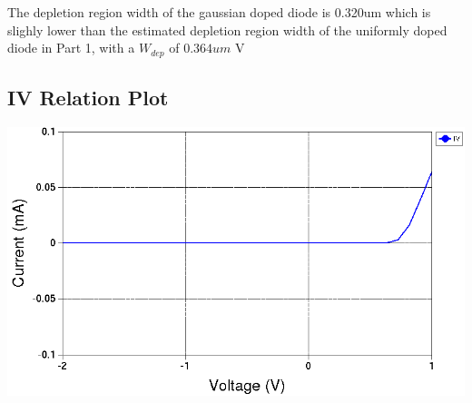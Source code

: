 \documentclass[12pt]{article}
\begin{document}
The depletion region width of the gaussian doped diode is 0.320um which is slighly lower than the estimated depletion region width of the uniformly doped diode in Part 1, with a $W_{dep}$ of $0.364um$ V\\

\subsection{IV Relation Plot}
\includegraphics[width=\textwidth]{5b.png}
\end{document}
